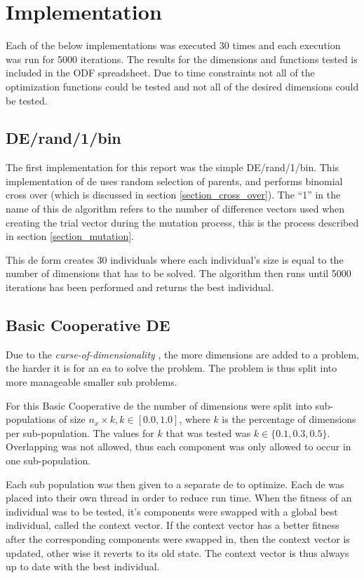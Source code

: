 \documentclass[hidelinks,english,conference]{IEEEtran}
\begin{document}
\section{Implementation}\label{section_implementation}
	Each of the below implementations was executed 30 times and each execution was run for 5000 iterations. The results for the dimensions and functions tested is included in the ODF spreadsheet. Due to time constraints not all of the optimization functions could be tested and not all of the desired dimensions could be tested.

	\subsection{DE/rand/1/bin} %
		The first implementation for this report was the simple DE/rand/1/bin. This implementation of \gls{de} uses random selection of parents, and performs binomial cross over (which is discussed in section \ref{section_cross_over}). The ``1'' in the name of this \gls{de} algorithm refers to the number of difference vectors used when creating the trial vector during the mutation process, this is the process described in section \ref{section_mutation}.

		This \gls{de} form creates 30 individuals where each individual's size is equal to the number of dimensions that has to be solved. The algorithm then runs until 5000 iterations has been performed and returns the best individual.
        
    \subsection{Basic Cooperative DE}\label{section_basic_coop_de} %
    	Due to the \textit{curse-of-dimensionality} \cite{dai2016cooperative}, the more dimensions are added to a problem, the harder it is for an \gls{ea} to solve the problem\cite{yang2008multilevel}. The problem is thus split into more manageable smaller sub problems.
        
    	For this Basic Cooperative \gls{de} the number of dimensions were split into sub-populations of size $n_x \times k, k \in \left[ 0.0, 1.0 \right]$, where $k$ is the percentage of dimensions per sub-population. The values for $k$ that was tested was $k \in \lbrace 0.1, 0.3, 0.5 \rbrace$. Overlapping was not allowed, thus each component was only allowed to occur in one sub-population.

		Each sub population was then given to a separate \gls{de} to optimize. Each \gls{de} was placed into their own thread in order to reduce run time. When the fitness of an individual was to be tested, it's components were swapped with a global best individual, called the context vector. If the context vector has a better fitness after the corresponding components were swapped in, then the context vector is updated, other wise it reverts to its old state. The context vector is thus always up to date with the best individual.
        
\end{document}
